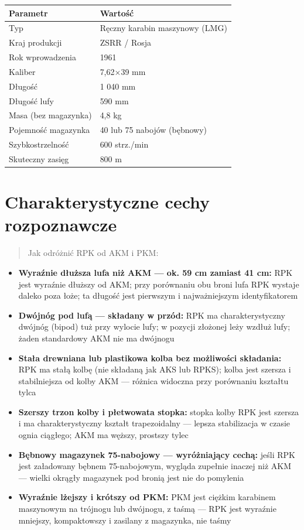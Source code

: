 \documentclass[12pt,openany,oneside]{book}
\providecommand{\tightlist}{%
  \setlength{\itemsep}{0pt}\setlength{\parskip}{0pt}}
\begin{document}
\begin{longtable}[]{@{}ll@{}}
\toprule\noalign{}
Parametr & Wartość \\
\midrule\noalign{}
\endhead
\bottomrule\noalign{}
\endlastfoot
Typ & Ręczny karabin maszynowy (LMG) \\
Kraj produkcji & ZSRR / Rosja \\
Rok wprowadzenia & 1961 \\
Kaliber & 7,62×39 mm \\
Długość & 1 040 mm \\
Długość lufy & 590 mm \\
Masa (bez magazynka) & 4,8 kg \\
Pojemność magazynka & 40 lub 75 nabojów (bębnowy) \\
Szybkostrzelność & 600 strz./min \\
Skuteczny zasięg & 800 m \\
\end{longtable}

\section{Charakterystyczne cechy
rozpoznawcze}\label{charakterystyczne-cechy-rozpoznawcze-54}

\begin{quote}
Jak odróżnić RPK od AKM i PKM:
\end{quote}

\begin{itemize}
\tightlist
\item
  \textbf{Wyraźnie dłuższa lufa niż AKM --- ok. 59 cm zamiast 41 cm:}
  RPK jest wyraźnie dłuższy od AKM; przy porównaniu obu broni lufa RPK
  wystaje daleko poza łoże; ta długość jest pierwszym i najważniejszym
  identyfikatorem
\item
  \textbf{Dwójnóg pod lufą --- składany w przód:} RPK ma
  charakterystyczny dwójnóg (bipod) tuż przy wylocie lufy; w pozycji
  złożonej leży wzdłuż lufy; żaden standardowy AKM nie ma dwójnogu
\item
  \textbf{Stała drewniana lub plastikowa kolba bez możliwości
  składania:} RPK ma stałą kolbę (nie składaną jak AKS lub RPKS); kolba
  jest szersza i stabilniejsza od kolby AKM --- różnica widoczna przy
  porównaniu kształtu tylca
\item
  \textbf{Szerszy trzon kolby i płetwowata stopka:} stopka kolby RPK
  jest szersza i ma charakterystyczny kształt trapezoidalny --- lepsza
  stabilizacja w czasie ognia ciągłego; AKM ma węższy, prostszy tylec
\item
  \textbf{Bębnowy magazynek 75-nabojowy --- wyróżniający cechą:} jeśli
  RPK jest załadowany bębnem 75-nabojowym, wygląda zupełnie inaczej niż
  AKM --- wielki okrągły magazynek pod bronią jest nie do pomylenia
\item
  \textbf{Wyraźnie lżejszy i krótszy od PKM:} PKM jest ciężkim karabinem
  maszynowym na trójnogu lub dwójnogu, z taśmą --- RPK jest wyraźnie
  mniejszy, kompaktowszy i zasilany z magazynka, nie taśmy
\end{itemize}
\end{document}
